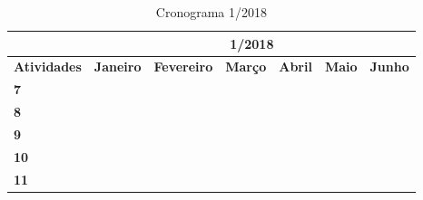 \documentclass[a4paper,12pt]{article}
\begin{document}
\begin{table}[H]
\centering
\caption{Cronograma 1/2018}
\label{my-label}
\begin{tabular}{|l|l|l|l|l|l|l|}
\hline
                    & \multicolumn{6}{c|}{\textbf{1/2018}}                                                                                                                                                                                                                        \\ \hline
\textbf{Atividades} & \textbf{Janeiro}         & \textbf{Fevereiro}                              & \textbf{Março}           & \textbf{Abril}                                  & \textbf{Maio}                                   & \textbf{Junho}                                  \\ \hline
\textbf{7}          & \cellcolor[HTML]{000000} & \cellcolor[HTML]{000000}{\color[HTML]{000000} } & \cellcolor[HTML]{000000} &                                                 &                                                 &                                                 \\ \hline
\textbf{8}         &                          &                                                 & \cellcolor[HTML]{000000} & \cellcolor[HTML]{000000}{\color[HTML]{000000} } &                                                 &                                                 \\ \hline
\textbf{9}         &                          &                                                 &                          & \cellcolor[HTML]{000000}                        &                                                 &                                                 \\ \hline
\textbf{10}         &                          &                                                 &                          &                                                 & \cellcolor[HTML]{000000}                        &                                                 \\ \hline
\textbf{11}         &                          &                                                 &                          &                                                 & \cellcolor[HTML]{000000}{\color[HTML]{000000} } & \cellcolor[HTML]{000000}{\color[HTML]{000000} } \\ \hline
\end{tabular}
\end{table}		
		
		
\newpage

\nocite{*}

\end{document}
